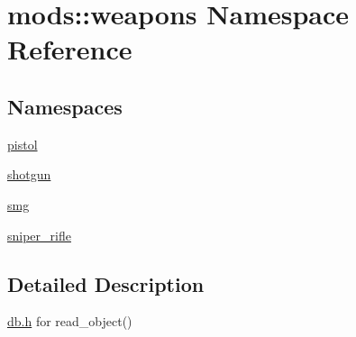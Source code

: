 \hypertarget{namespacemods_1_1weapons}{}\section{mods\+:\+:weapons Namespace Reference}
\label{namespacemods_1_1weapons}
\subsection*{Namespaces}
\begin{DoxyCompactItemize}
\item 
 \hyperlink{namespacemods_1_1weapons_1_1pistol}{pistol}
\item 
 \hyperlink{namespacemods_1_1weapons_1_1shotgun}{shotgun}
\item 
 \hyperlink{namespacemods_1_1weapons_1_1smg}{smg}
\item 
 \hyperlink{namespacemods_1_1weapons_1_1sniper__rifle}{sniper\+\_\+rifle}
\end{DoxyCompactItemize}


\subsection{Detailed Description}
\hyperlink{db_8h_source}{db.\+h} for read\+\_\+object() 